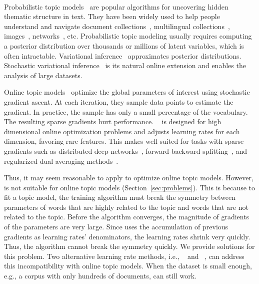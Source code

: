 \paragraph{}
\label{sec:introduction}



Probabilistic topic models~\cite{blei2012probabilistic} are popular
algorithms for uncovering hidden thematic structure in text. They
have been widely used to help people understand and navigate
document collections~\cite{blei2003latent}, multilingual collections~\cite{Hu:Zhai:Eidelman:Boyd-Graber-2014}, images~\cite{chong2009simultaneous},
networks~\cite{chang2009relational, yang2016discriminative},
etc. Probabilistic topic modeling usually requires computing a posterior
distribution over thousands or millions of latent variables, which is
often intractable. Variational
inference~\cite[]{blei2016variational} approximates posterior distributions. Stochastic
variational inference~\cite[]{hoffman2013stochastic} is its
natural online extension
and enables the analysis of large datasets.



Online topic models~\cite{hoffman2010online,
	bryant2012truly, paisley2015nested} optimize the global parameters of interest using
stochastic gradient ascent. At each iteration, they sample data
points to estimate the gradient. In practice, the sample has
only a small percentage of the vocabulary.  The resulting sparse
gradients hurt performance.  \adagrad{}~\cite{duchi2011adaptive} is
designed for high dimensional online optimization problems and adjusts
learning rates for each dimension, favoring rare features.
This makes \adagrad{} well-suited for tasks with sparse gradients such as
distributed deep networks~\cite{dean2012large},
forward-backward splitting~\cite{duchi2009efficient},
and regularized dual averaging methods~\cite{xiao2010dual}.

Thus, it may seem reasonable to apply \adagrad{} to optimize online
topic models. However, \adagrad{} is not suitable for
online topic models (Section~\ref{sec:problems}). This is because to fit a topic model, the training algorithm must break the symmetry between parameters of words that are highly related to the topic and words that are not related to the topic. Before the algorithm converges, the magnitude of gradients of the parameters are very large. Since  uses the accumulation of previous gradients as learning rates' denominators, the learning rates shrink very quickly. Thus, the algorithm cannot break the symmetry quickly. We provide solutions for this problem. Two alternative learning rate methods, i.e., ~\cite{zeiler2012adadelta} and ~\cite{kingma2014adam}, can address this incompatibility with online topic models. When the dataset is small enough, e.g., a corpus with only hundreds of documents,  can still work.



